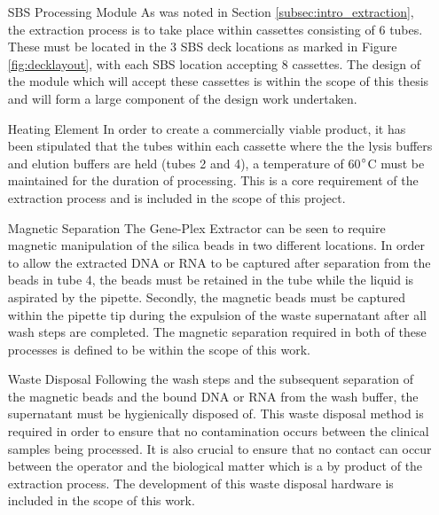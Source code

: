\begin{enumerate}
	\item [SBS Processing Module] As was noted in Section \ref{subsec:intro_extraction}, the extraction process is to take place within cassettes consisting of 6 tubes. These must be located in the 3 SBS deck locations as marked in Figure \ref{fig:decklayout}, with each SBS location accepting 8 cassettes. The design of the module which will accept these cassettes is within the scope of this thesis and will form a large component of the design work undertaken.

	\item [Heating Element] In order to create a commercially viable product, it has been stipulated that the tubes within each cassette where the the lysis buffers and elution buffers are held (tubes 2 and 4), a temperature of 60$\degree$C must be maintained for the duration of processing. This is a core requirement of the extraction process and is included in the scope of this project.

	\item [Magnetic Separation] The Gene-Plex Extractor can be seen to require magnetic manipulation of the silica beads in two different locations. In order to allow the extracted DNA or RNA to be captured after separation from the beads in tube 4, the beads must be retained in the tube while the liquid is aspirated by the pipette. Secondly, the magnetic beads must be captured within the pipette tip during the expulsion of the waste supernatant after all wash steps are completed. The magnetic separation required in both of these processes is defined to be within the scope of this work. 

	\item [Waste Disposal] Following the wash steps and the subsequent separation of the magnetic beads and the bound DNA or RNA from the wash buffer, the supernatant must be hygienically disposed of. This waste disposal method is required in order to ensure that no contamination occurs between the clinical samples being processed. It is also crucial to ensure that no contact can occur between the operator and the biological matter which is a by product of the extraction process. The development of this waste disposal hardware is included in the scope of this work.
	
\end{enumerate}

